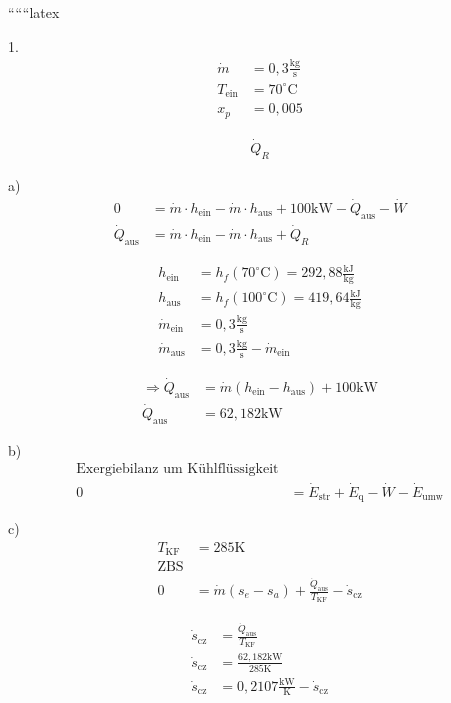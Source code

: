 
``````latex


1. 
\begin{align*}
\dot{m} &= 0,3 \frac{\text{kg}}{\text{s}} \\
T_{\text{ein}} &= 70^\circ \text{C} \\
x_p &= 0,005
\end{align*}

\begin{align*}
\dot{Q}_R
\end{align*}

a) 
\begin{align*}
0 &= \dot{m} \cdot h_{\text{ein}} - \dot{m} \cdot h_{\text{aus}} + 100 \text{kW} - \dot{Q}_{\text{aus}} - \dot{W} \\
\dot{Q}_{\text{aus}} &= \dot{m} \cdot h_{\text{ein}} - \dot{m} \cdot h_{\text{aus}} + \dot{Q}_R
\end{align*}

\begin{align*}
h_{\text{ein}} &= h_f (70^\circ \text{C}) = 292,88 \frac{\text{kJ}}{\text{kg}} \\
h_{\text{aus}} &= h_f (100^\circ \text{C}) = 419,64 \frac{\text{kJ}}{\text{kg}} \\
\dot{m}_{\text{ein}} &= 0,3 \frac{\text{kg}}{\text{s}} \\
\dot{m}_{\text{aus}} &= 0,3 \frac{\text{kg}}{\text{s}} - \dot{m}_{\text{ein}}
\end{align*}

\begin{align*}
\Rightarrow \dot{Q}_{\text{aus}} &= \dot{m} (h_{\text{ein}} - h_{\text{aus}}) + 100 \text{kW} \\
\dot{Q}_{\text{aus}} &= 62,182 \text{kW}
\end{align*}

b) 
\begin{align*}
\text{Exergiebilanz um Kühlflüssigkeit} \\
0 &= \dot{E}_{\text{str}} + \dot{E}_{\text{q}} - \dot{W} - \dot{E}_{\text{umw}}
\end{align*}

c) 
\begin{align*}
T_{\text{KF}} &= 285 \text{K} \\
\text{ZBS} \\
0 &= \dot{m} (s_e - s_a) + \frac{\dot{Q}_{\text{aus}}}{T_{\text{KF}}} - \dot{s}_{\text{cz}}
\end{align*}

\begin{align*}
\dot{s}_{\text{cz}} &= \frac{\dot{Q}_{\text{aus}}}{T_{\text{KF}}} \\
\dot{s}_{\text{cz}} &= \frac{62,182 \text{kW}}{285 \text{K}} \\
\dot{s}_{\text{cz}} &= 0,2107 \frac{\text{kW}}{\text{K}} - \dot{s}_{\text{cz}}
\end{align*}

